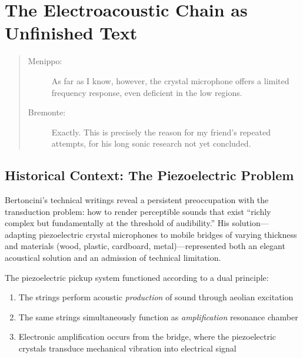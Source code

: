 \section{The Electroacoustic Chain as Unfinished Text}

\begin{quote}
  \begin{sf}
    \small
    \begin{description}
      \item[Menippo:] As far as I know, however, the crystal microphone offers 
      a limited frequency response, even deficient in the low regions.
      \item[Bremonte:] Exactly. This is precisely the reason for my friend's 
      repeated attempts, for his long sonic research not yet concluded. 
      \cite{bertoncini07}
    \end{description}
  \end{sf}
\end{quote}

\subsection{Historical Context: The Piezoelectric Problem}

Bertoncini's technical writings reveal a persistent preoccupation with the 
transduction problem: how to render perceptible sounds that exist ``richly 
complex but fundamentally at the threshold of audibility.'' His solution---
adapting piezoelectric crystal microphones to mobile bridges of varying 
thickness and materials (wood, plastic, cardboard, metal)---represented both 
an elegant acoustical solution and an admission of technical limitation.

The piezoelectric pickup system functioned according to a dual principle:
\begin{enumerate}
  \item The strings perform acoustic \emph{production} of sound through aeolian 
  excitation
  \item The same strings simultaneously function as \emph{amplification} 
  resonance chamber
  \item Electronic amplification occurs from the bridge, where the piezoelectric 
  crystals transduce mechanical vibration into electrical signal
\end{enumerate}

